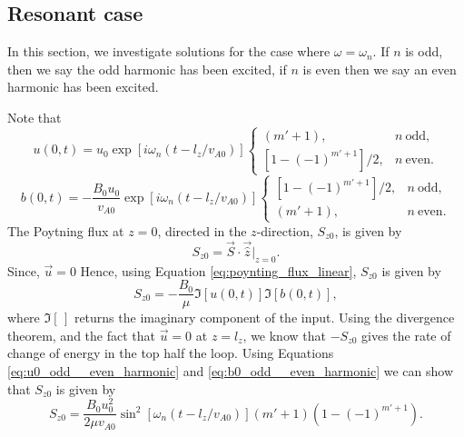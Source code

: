 \subsection{Resonant case}
\label{sec:case_where_omega=omega_n}

In this section, we investigate solutions for the case where $\omega=\omega_n$. If $n$ is odd, then we say the odd harmonic has been excited, if $n$ is even then we say an even harmonic has been excited. 

Note that
\begin{equation}
    \label{eq:u0_odd__even_harmonic}
    u(0,t) = u_0 \exp[i\omega_n(t - l_z/v_{A0})]\begin{cases}
   (m'+1), & n\ \text{odd}, \\
   [1-(-1)^{m'+1}]/2, & n\ \text{even}.
    \end{cases}
\end{equation}
\begin{equation}
    \label{eq:b0_odd__even_harmonic}
    b(0,t) = -\frac{B_0u_0}{v_{A0}} \exp[i\omega_n(t - l_z/v_{A0})]\begin{cases}
   [1-(-1)^{m'+1}]/2, & n\ \text{odd}, \\
   (m'+1), & n\ \text{even}.
    \end{cases}
\end{equation}
The Poytning flux at $z=0$, directed in the $z$-direction, $S_{z0}$, is given by
\begin{equation}
    S_{z0} = \vec{S}\cdot\vec{\hat{z}}|_{z=0}.
\end{equation}
Since, $\vec{u}=0$
Hence, using  Equation \eqref{eq:poynting_flux_linear}, $S_{z0}$ is given by
\begin{equation}
    S_{z0} = -\frac{B_0}{\mu}\Im[u(0,t)]\Im[b(0,t)],
\end{equation}
where $\Im[\,]$ returns the imaginary component of the input. Using the divergence theorem, and the fact that $\vec{u}=0$ at $z=l_z$, we know that $-S_{z0}$ gives the rate of change of energy in the top half the loop. Using Equations \eqref{eq:u0_odd__even_harmonic} and \eqref{eq:b0_odd__even_harmonic} we can show that $S_{z0}$ is given by
\begin{equation}
    S_{z0}=\frac{B_0u_0^2}{2\mu v_{A0}}\sin^2[\omega_n(t - l_z/v_{A0})](m'+1)(1-(-1)^{m'+1}).
\end{equation}

